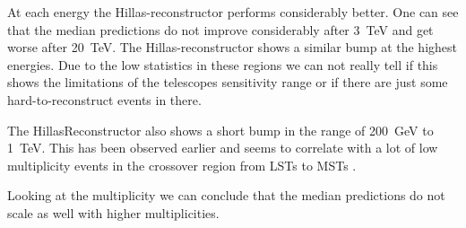At each energy the Hillas-reconstructor performs considerably better.
One can see that the median predictions do not improve considerably after
\SI{3}{\tera\electronvolt} and get worse after \SI{20}{\tera\electronvolt}.
The Hillas-reconstructor shows a similar bump at the highest energies.
Due to the low statistics in these regions we can not really tell 
if this shows the limitations of the telescopes sensitivity range 
or if there are just some hard-to-reconstruct events in there. 

The HillasReconstructor also shows a short bump in the range of \SI{200}{\giga\electronvolt}
to \SI{1}{\tera\electronvolt}. 
This has been observed earlier and seems to correlate with 
a lot of low multiplicity events in the crossover region from LSTs to MSTs \cite{????}.

Looking at the multiplicity we can conclude that the median predictions
do not scale as well with higher multiplicities.

